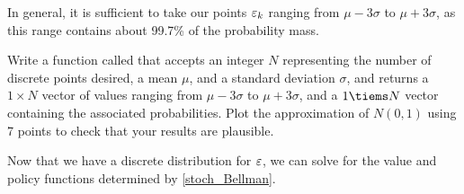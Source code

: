 In general, it is sufficient to take our points $\varepsilon_k$ ranging from $\mu - 3\sigma$ to $\mu + 3\sigma$, as this 
range contains about 99.7\% of the probability mass.

\begin{problem}
Write a function called  that accepts an integer $N$ representing the number of discrete points 
desired, a mean $\mu$, and a standard deviation $\sigma$, and returns a $1\times N$ vector of values ranging from 
$\mu - 3\sigma$ to $\mu + 3\sigma$, and a $1\tiems N$ vector containing the associated probabilities.  
Plot the approximation of $N(0,1)$ using 7 points to check that your results are plausible.
\end{problem}

Now that we have a discrete distribution for $\varepsilon$, we can solve for the value and policy functions 
determined by \eqref{stoch_Bellman}.

